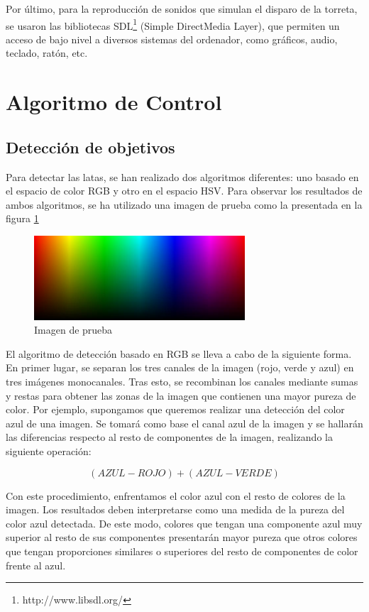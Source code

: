 Por último, para la reproducción de sonidos que simulan el disparo de la torreta, se usaron las bibliotecas SDL\footnote{http://www.libsdl.org/} (Simple DirectMedia Layer), que permiten un acceso de bajo nivel a diversos sistemas del ordenador, como gráficos, audio, teclado, ratón, etc.\\

\newpage

\section{Algoritmo de Control}
\subsection{Detección de objetivos}
Para detectar las latas, se han realizado dos algoritmos diferentes: uno basado en el espacio de color RGB y otro en el espacio HSV. Para observar los resultados de ambos algoritmos, se ha utilizado una imagen de prueba como la presentada en la figura \ref{imagendeprueba}\\

\begin{figure}[h]
\centering
\includegraphics[width=0.7\textwidth]{images/imagendeprueba}%
\caption{Imagen de prueba}
\label{imagendeprueba}
\end{figure}
\FloatBarrier

El algoritmo de detección basado en RGB se lleva a cabo de la siguiente forma. En primer lugar, se separan los tres canales de la imagen (rojo, verde y azul) en tres imágenes monocanales. Tras esto, se recombinan los canales mediante sumas y restas para obtener las zonas de la imagen que contienen una mayor pureza de color. Por ejemplo, supongamos que queremos realizar una detección del color azul de una imagen. Se tomará como base el canal azul de la imagen y se hallarán las diferencias respecto al resto de componentes de la imagen, realizando la siguiente operación:

\[(AZUL - ROJO) + (AZUL - VERDE)\]

Con este procedimiento, enfrentamos el color azul con el resto de colores de la imagen. Los resultados deben interpretarse como una medida de la pureza del color azul detectada. De este modo, colores que tengan una componente azul muy superior al resto de sus componentes presentarán mayor pureza que otros colores que tengan proporciones similares o superiores del resto de componentes de color frente al azul.\\

